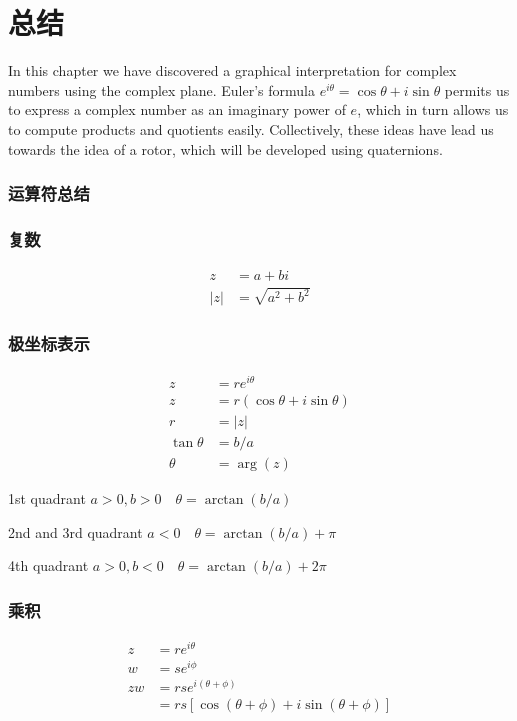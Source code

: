 \section{总结}
In this chapter we have discovered a graphical interpretation for complex numbers using the complex plane. Euler's formula $e^{i \theta}=\cos \theta+i \sin \theta$ permits us to express a complex number as an imaginary power of $e$, which in turn allows us to compute products and quotients easily. Collectively, these ideas have lead us towards the idea of a rotor, which will be developed using quaternions.

\subsubsection{运算符总结}
\subsubsection*{复数}
$$
\begin{aligned}
z & =a+b i \\
|z| & =\sqrt{a^{2}+b^{2}}
\end{aligned}
$$

\subsubsection*{极坐标表示}

$$
\begin{aligned}
z & =r e^{i \theta} \\
z & =r(\cos \theta+i \sin \theta) \\
r & =|z| \\
\tan \theta & =b / a \\
\theta & =\arg (z)
\end{aligned}
$$

1st quadrant $a>0, b>0 \quad \theta=\arctan (b / a)$

2nd and 3rd quadrant $a<0 \quad \theta=\arctan (b / a)+\pi$

4th quadrant $a>0, b<0 \quad \theta=\arctan (b / a)+2 \pi$

\subsubsection*{乘积}
$$
\begin{aligned}
z & =r e^{i \theta} \\
w & =s e^{i \phi} \\
z w & =r s e^{i(\theta+\phi)} \\
& =r s[\cos (\theta+\phi)+i \sin (\theta+\phi)]
\end{aligned}
$$

